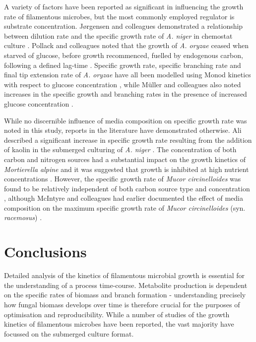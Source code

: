 A variety of factors have been reported as significant in influencing the growth rate of filamentous microbes, but the most commonly employed regulator is substrate concentration. J{\o}rgensen and colleagues demonstrated a relationship between dilution rate and the specific growth rate of \emph{A. niger} in chemostat culture \cite{jorgensen2007}. Pollack and colleagues noted that the growth of \emph{A. oryzae} ceased when starved of glucose, before growth recommenced, fuelled by endogenous carbon, following a defined lag-time \cite{pollack2008}. Specific growth rate, specific branching rate and final tip extension rate of \emph{A. oryzae} have all been modelled using Monod kinetics with respect to glucose concentration \cite{spohr1998}, while M\"{u}ller and colleagues also noted increases in the specific growth and branching rates in the presence of increased glucose concentration \cite{muller2002}. 

While no discernible influence of media composition on specific growth rate was noted in this study, reports in the literature have demonstrated otherwise. Ali described a significant increase in specific growth rate resulting from the addition of kaolin in the submerged culturing of \emph{A. niger} \cite{ali2006}. The concentration of both carbon and nitrogen sources had a substantial impact on the growth kinetics of \emph{Mortierella alpine} and it was suggested that growth is inhibited at high nutrient concentrations \cite{eypark2002}. However, the specific growth rate of \emph{Mucor circinelloides} was found to be relatively independent of both carbon source type and concentration \cite{lubbehusen2003}, although McIntyre and colleagues had earlier documented the effect of media composition on the maximum specific growth rate of \emph{Mucor circinelloides} (syn. \emph{racemosus}) \cite{mcintyre2002}.


\section{Conclusions}

Detailed analysis of the kinetics of filamentous microbial growth is essential for the understanding of a process time-course. Metabolite production is dependent on the specific rates of biomass and branch formation - understanding precisely how fungal biomass develops over time is therefore crucial for the purposes of optimisation and reproducibility. While a number of studies of the growth kinetics of filamentous microbes have been reported, the vast majority have focussed on the submerged culture format.

